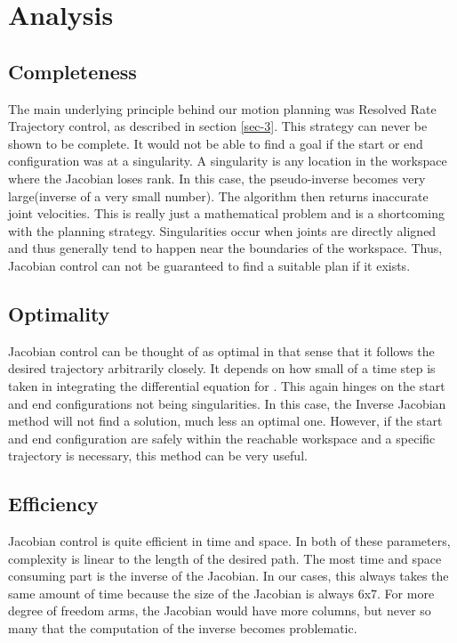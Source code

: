 \documentclass[10pt, conference]{IEEEtran}
\begin{document}
\section{Analysis}
\label{sec-5}
\subsection{Completeness}
\label{sec-5-1}

   The main underlying principle behind our motion planning was
   Resolved Rate Trajectory control, as described in section \ref{sec-3}.  
   This strategy can never be shown to be complete. It would
   not be able to find a goal if the start or end configuration was at
   a singularity. A singularity is any location in the workspace where
   the Jacobian loses rank. In this case, the pseudo-inverse becomes
   very large(inverse of a very small number). The algorithm then
   returns inaccurate joint velocities. This is really just a
   mathematical problem and is a shortcoming with the planning
   strategy. Singularities occur when joints are directly aligned and
   thus generally tend to happen near the boundaries of the
   workspace. Thus, Jacobian control can not be guaranteed to find a
   suitable plan if it exists.
\subsection{Optimality}
\label{sec-5-2}

   Jacobian control can be thought of as optimal in that sense that it
   follows the desired trajectory arbitrarily closely. It depends on
   how small of a time step is taken in integrating the differential
   equation for \mathbf{\dot{\alpha}}. This again hinges on the start and end
   configurations not being singularities. In this case, the Inverse
   Jacobian method will not find a solution, much less an optimal
   one. However, if the start and end configuration are safely within
   the reachable workspace and a specific trajectory is necessary, this
   method can be very useful.
\subsection{Efficiency}
\label{sec-5-3}


   Jacobian control is quite efficient in time and space. In both of
   these parameters, complexity is linear to the length of the desired
   path. The most time and space consuming part is the inverse of the
   Jacobian. In our cases, this always takes the same amount of time
   because the size of the Jacobian is always 6x7. For more degree of
   freedom arms, the Jacobian would have more columns, but never so
   many that the computation of the inverse becomes problematic.
\end{document}
